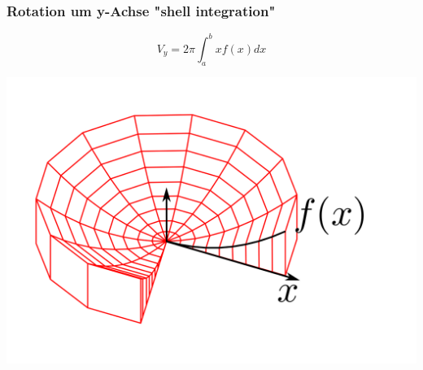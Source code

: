 \subsubsection{Rotation um y-Achse "shell integration"}
    \begin{minipage}{0.5\linewidth}
        $$ V_y = 2\pi \int_a^b xf(x)dx $$
    \end{minipage}
    \begin{minipage}{0.49\linewidth}
         \includegraphics[width=\linewidth]{src/Mehrdimensionale-Funktionen_Integralrechnung/shell_integration.png}
    \end{minipage}


